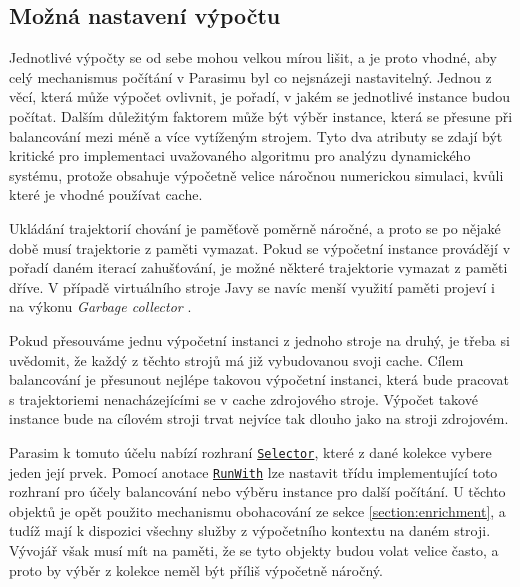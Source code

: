 \subsection{Možná nastavení výpočtu}

Jednotlivé výpočty se od sebe mohou velkou mírou lišit, a je proto vhodné, aby celý mechanismus
počítání v Parasimu byl co nejsnázeji nastavitelný. Jednou z věcí, která může výpočet ovlivnit, je pořadí,
v jakém se jednotlivé instance budou počítat. Dalším důležitým faktorem může být výběr instance,
která se přesune při balancování mezi méně a více vytíženým strojem. Tyto dva atributy se zdají být
kritické pro implementaci uvažovaného algoritmu pro analýzu dynamického systému, protože obsahuje
výpočetně velice náročnou numerickou simulaci, kvůli které je vhodné používat cache.

Ukládání trajektorií chování je paměťově poměrně náročné, a proto se po nějaké době
musí trajektorie z paměti vymazat. Pokud se výpočetní instance pro\-vá\-dě\-jí v pořadí daném
iterací zahušťování, je možné některé trajektorie vymazat z paměti dříve. V případě virtuálního
stroje Javy se navíc menší využití paměti projeví i na výkonu \textit{Garbage collector} \cite{printezis2000}. 

Pokud přesouváme jednu výpočetní instanci z jednoho stroje na druhý, je třeba si uvědomit,
že každý z těchto strojů má již vybudovanou svoji cache. Cílem balancování je přesunout
nejlépe takovou výpočetní instanci, která bude pracovat s trajektoriemi nenacházejícími
se v cache zdrojového stroje. Výpočet takové instance bude na cílovém stroji trvat nejvíce tak dlou\-ho jako
na stroji zdrojovém.

Parasim k tomuto účelu nabízí rozhraní \href{https://github.com/sybila/parasim/blob/2.0.0.Final/extensions/computation-lifecycle-api/src/main/java/org/sybila/parasim/computation/lifecycle/api/Selector.java}{\texttt{Selector}}, které z dané kolekce vybere jeden její prvek. Pomocí anotace \href{https://github.com/sybila/parasim/blob/2.0.0.Final/extensions/computation-lifecycle-api/src/main/java/org/sybila/parasim/computation/lifecycle/api/annotations/RunWith.java}{\texttt{RunWith}} lze nastavit třídu implementující toto rozhraní
pro účely balancování nebo výběru instance pro další počítání. U těchto objektů je opět použito mechanismu obohacování ze sekce \ref{section:enrichment},
a tudíž mají k dispozici všechny služby z výpočetního kontextu na daném stroji.
Vývojář však musí mít na paměti, že se tyto objekty budou volat velice často, 
a proto by výběr z kolekce neměl být příliš výpočetně náročný.


